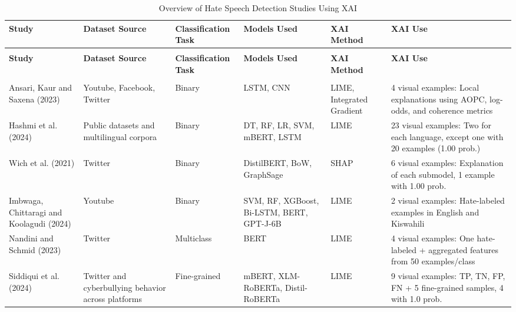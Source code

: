 \documentclass{article}
\begin{document}
\begin{longtable}{@{} >{\Centering\arraybackslash}p{2.8cm} >{\Centering\arraybackslash}p{1.7cm} >{\Centering\arraybackslash}p{2.2cm} >{\Centering\arraybackslash}p{2.4cm} >{\Centering\arraybackslash}p{1.6cm} p{5cm} @{}} %
\caption{Overview of Hate Speech Detection Studies Using XAI} \\
\toprule
\textbf{Study} & \textbf{Dataset Source} & \textbf{Classification Task} & \textbf{Models Used} & \textbf{XAI Method} & \textbf{XAI Use} \\
\midrule
\endfirsthead

\multicolumn{6}{c}{{\bfseries \tablename\ \thetable{} -- continued from previous page}} \\
\toprule
\textbf{Study} & \textbf{Dataset Source} & \textbf{Classification Task} & \textbf{Models Used} & \textbf{XAI Method} & \textbf{XAI Use} \\
\midrule
\endhead

\midrule
\multicolumn{6}{r}{{Continued on next page}} \\
\endfoot

\bottomrule
\endlastfoot

Ansari, Kaur and Saxena (2023) & Youtube, Facebook, Twitter & Binary & LSTM, CNN & LIME, Integrated Gradient & 4 visual examples: Local explanations using AOPC, log-odds, and coherence metrics \\

Hashmi et al. (2024) & Public datasets and multilingual corpora & Binary & DT, RF, LR, SVM, mBERT, LSTM & LIME & 23 visual examples: Two for each language, except one with 20 examples (1.00 prob.) \\

Wich et al. (2021) & Twitter & Binary & DistilBERT, BoW, GraphSage & SHAP & 6 visual examples: Explanation of each submodel, 1 example with 1.00 prob. \\

Imbwaga, Chittaragi and Koolagudi (2024) & Youtube & Binary & SVM, RF, XGBoost, Bi-LSTM, BERT, GPT-J-6B & LIME & 2 visual examples: Hate-labeled examples in English and Kiswahili \\

Nandini and Schmid (2023) & Twitter & Multiclass & BERT & LIME & 4 visual examples: One hate-labeled + aggregated features from 50 examples/class \\

Siddiqui et al. (2024) & Twitter and cyberbullying behavior across platforms & Fine-grained & mBERT, XLM-RoBERTa, Distil-RoBERTa & LIME & 9 visual examples: TP, TN, FP, FN + 5 fine-grained samples, 4 with 1.0 prob. \\


\end{longtable}
\end{document}
